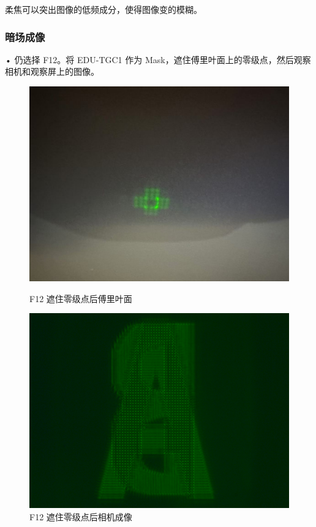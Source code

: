 \documentclass{ctexart}
\begin{document}
柔焦可以突出图像的低频成分，使得图像变的模糊。
\subsubsection{暗场成像}
• 仍选择 F12。将 EDU-TGC1 作为 Mask，遮住傅里叶面上的零级点，然后观察相机和观察屏上的图像。
\begin{figure}[H]
  \centering
  \begin{minipage}[b]{0.3\textwidth}
    \centering
    \includegraphics[width=\textwidth]{pictures/微信图片_20241017164755.jpg}
    \caption{F12 遮住零级点后傅里叶面}
  \end{minipage}
  \hspace{0.1\textwidth} %
  \begin{minipage}[b]{0.3\textwidth}
    \centering
    \includegraphics[width=\textwidth]{pictures/F12-mask-Ex27.png}
    \caption{F12 遮住零级点后相机成像}
  \end{minipage}
\end{figure}
\end{document}
